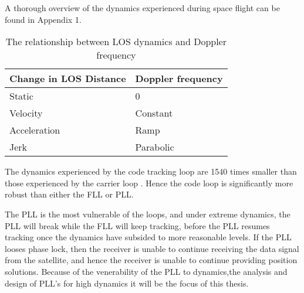 A thorough overview of the dynamics experienced during space flight can be found in Appendix 1.
\begin{table}[!htb]
\centering
\begin{tabular}{|l|l|}
\hline
\rowcolor[HTML]{C0C0C0} 
Change in \ac{LOS} Distance & Doppler frequency \\ \hline
Static                 & 0                 \\ \hline
\rowcolor[HTML]{EFEFEF} 
Velocity               & Constant          \\ \hline
Acceleration           & Ramp              \\ \hline
\rowcolor[HTML]{EFEFEF} 
Jerk                   & Parabolic         \\ \hline
\end{tabular}
\caption{The relationship between \ac{LOS} dynamics and Doppler frequency}
\label{table:DopplerDynamics}
\end{table}


The dynamics experienced by the code tracking loop are 1540 times smaller than those experienced by the carrier loop \cite{Kaplan}. Hence the  code loop is significantly more robust than either the \ac{FLL} or \ac{PLL}.

The \ac{PLL} is the most vulnerable of the loops, and under extreme dynamics, the \ac{PLL} will break while the \ac{FLL} will keep tracking, before the \ac{PLL} resumes tracking once the dynamics have subsided to more reasonable levels. If the \ac{PLL} looses phase lock, then the receiver is unable to continue receiving the data signal from the satellite, and hence the receiver is unable to continue providing position solutions. Because of the venerability of the \ac{PLL} to dynamics,the analysis and design of \ac{PLL}'s for high dynamics it will be the focus of this thesis. 
